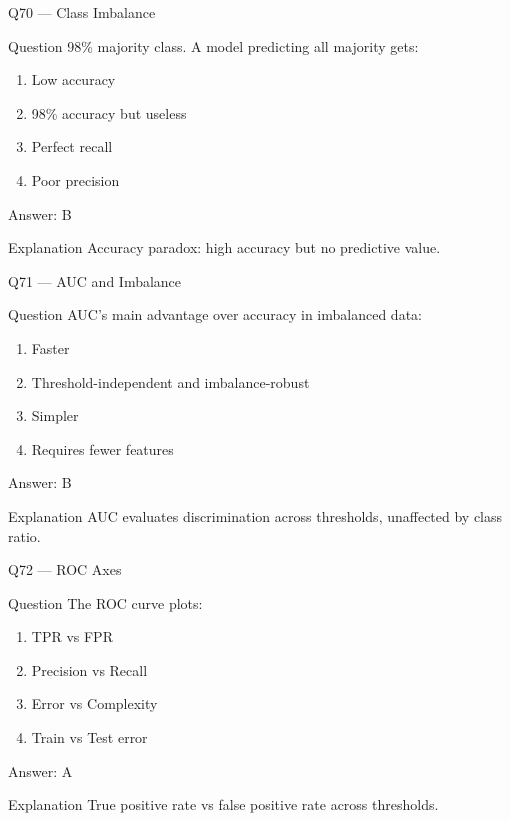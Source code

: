 \documentclass[aspectratio=169,8pt]{beamer}
\begin{document}
	\begin{frame}{Q70 --- Class Imbalance}
		\begin{block}{Question}
			98\% majority class. A model predicting all majority gets:
		\end{block}
		\begin{enumerate}
			\item Low accuracy
			\item 98\% accuracy but useless
			\item Perfect recall
			\item Poor precision
		\end{enumerate}
		\begin{exampleblock}{Answer: B}\end{exampleblock}
		\begin{block}{Explanation}
			Accuracy paradox: high accuracy but no predictive value.
		\end{block}
	\end{frame}
	
	\begin{frame}{Q71 --- AUC and Imbalance}
		\begin{block}{Question}
			AUC's main advantage over accuracy in imbalanced data:
		\end{block}
		\begin{enumerate}
			\item Faster
			\item Threshold-independent and imbalance-robust
			\item Simpler
			\item Requires fewer features
		\end{enumerate}
		\begin{exampleblock}{Answer: B}\end{exampleblock}
		\begin{block}{Explanation}
			AUC evaluates discrimination across thresholds, unaffected by class ratio.
		\end{block}
	\end{frame}
	
	\begin{frame}{Q72 --- ROC Axes}
		\begin{block}{Question}
			The ROC curve plots:
		\end{block}
		\begin{enumerate}
			\item TPR vs FPR
			\item Precision vs Recall
			\item Error vs Complexity
			\item Train vs Test error
		\end{enumerate}
		\begin{exampleblock}{Answer: A}\end{exampleblock}
		\begin{block}{Explanation}
			True positive rate vs false positive rate across thresholds.
		\end{block}
	\end{frame}
	
\end{document}
